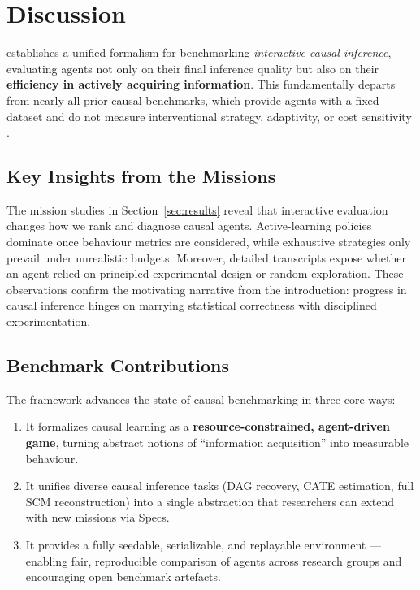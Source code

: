 \section{Discussion}
\game establishes a unified formalism for benchmarking \emph{interactive causal inference}, evaluating agents not only on their final inference quality but also on their \textbf{efficiency in actively acquiring information}.  
This fundamentally departs from nearly all prior causal benchmarks, which provide agents with a fixed dataset and do not measure interventional strategy, adaptivity, or cost sensitivity \citep{CauseBox2021,CausalBench2024,RealCause2021}.

\subsection{Key Insights from the Missions}
The mission studies in Section~\ref{sec:results} reveal that interactive evaluation changes how we rank and diagnose causal agents. Active-learning policies dominate once behaviour metrics are considered, while exhaustive strategies only prevail under unrealistic budgets. Moreover, detailed transcripts expose whether an agent relied on principled experimental design or random exploration. These observations confirm the motivating narrative from the introduction: progress in causal inference hinges on marrying statistical correctness with disciplined experimentation.

\subsection{Benchmark Contributions}
The framework advances the state of causal benchmarking in three core ways:
\begin{enumerate}
    \item It formalizes causal learning as a \textbf{resource-constrained, agent-driven game}, turning abstract notions of ``information acquisition'' into measurable behaviour.
    \item It unifies diverse causal inference tasks (DAG recovery, CATE estimation, full SCM reconstruction) into a single abstraction that researchers can extend with new missions via Specs.
    \item It provides a fully seedable, serializable, and replayable environment — enabling fair, reproducible comparison of agents across research groups and encouraging open benchmark artefacts.
\end{enumerate}


